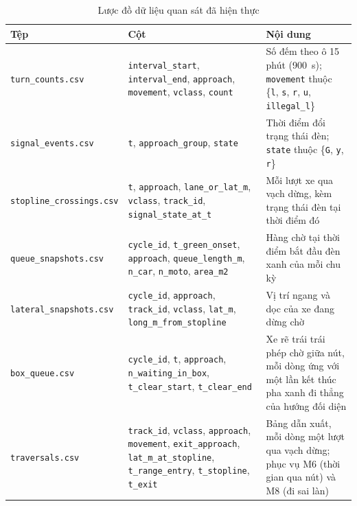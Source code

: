 \documentclass[../main.tex]{subfiles}
\begin{document}
\begin{table}[!htbp]
\centering
\small\setlength{\tabcolsep}{3pt}
\caption{Lược đồ dữ liệu quan sát đã hiện thực}
\label{table:appendix_schema}
\begin{tabular}{|p{3.7cm}|p{5.1cm}|p{4.2cm}|}
\hline
\textbf{Tệp} & \textbf{Cột} & \textbf{Nội dung} \\ \hline
\texttt{turn\_\allowbreak counts.csv} & \texttt{interval\_\allowbreak start}, \texttt{interval\_\allowbreak end}, \texttt{approach}, \texttt{movement}, \texttt{vclass}, \texttt{count} & Số đếm theo ô 15 phút (900~s); \texttt{movement} thuộc \{\texttt{l}, \texttt{s}, \texttt{r}, \texttt{u}, \texttt{illegal\_\allowbreak l}\} \\ \hline
\texttt{signal\_\allowbreak events.csv} & \texttt{t}, \texttt{approach\_\allowbreak group}, \texttt{state} & Thời điểm đổi trạng thái đèn; \texttt{state} thuộc \{\texttt{G}, \texttt{y}, \texttt{r}\} \\ \hline
\texttt{stopline\_\allowbreak crossings.csv} & \texttt{t}, \texttt{approach}, \texttt{lane\_\allowbreak or\_\allowbreak lat\_\allowbreak m}, \texttt{vclass}, \texttt{track\_\allowbreak id}, \texttt{signal\_\allowbreak state\_\allowbreak at\_\allowbreak t} & Mỗi lượt xe qua vạch dừng, kèm trạng thái đèn tại thời điểm đó \\ \hline
\texttt{queue\_\allowbreak snapshots.csv} & \texttt{cycle\_\allowbreak id}, \texttt{t\_\allowbreak green\_\allowbreak onset}, \texttt{approach}, \texttt{queue\_\allowbreak length\_\allowbreak m}, \texttt{n\_\allowbreak car}, \texttt{n\_\allowbreak moto}, \texttt{area\_\allowbreak m2} & Hàng chờ tại thời điểm bắt đầu đèn xanh của mỗi chu kỳ \\ \hline
\texttt{lateral\_\allowbreak snapshots.csv} & \texttt{cycle\_\allowbreak id}, \texttt{approach}, \texttt{track\_\allowbreak id}, \texttt{vclass}, \texttt{lat\_\allowbreak m}, \texttt{long\_\allowbreak m\_\allowbreak from\_\allowbreak stopline} & Vị trí ngang và dọc của xe đang dừng chờ \\ \hline
\texttt{box\_\allowbreak queue.csv} & \texttt{cycle\_\allowbreak id}, \texttt{t}, \texttt{approach}, \texttt{n\_\allowbreak waiting\_\allowbreak in\_\allowbreak box}, \texttt{t\_\allowbreak clear\_\allowbreak start}, \texttt{t\_\allowbreak clear\_\allowbreak end} & Xe rẽ trái trái phép chờ giữa nút, mỗi dòng ứng với một lần kết thúc pha xanh đi thẳng của hướng đối diện \\ \hline
\texttt{traversals.csv} & \texttt{track\_\allowbreak id}, \texttt{vclass}, \texttt{approach}, \texttt{movement}, \texttt{exit\_\allowbreak approach}, \texttt{lat\_\allowbreak m\_\allowbreak at\_\allowbreak stopline}, \texttt{t\_\allowbreak range\_\allowbreak entry}, \texttt{t\_\allowbreak stopline}, \texttt{t\_\allowbreak exit} & Bảng dẫn xuất, mỗi dòng một lượt qua vạch dừng; phục vụ M6 (thời gian qua nút) và M8 (đi sai làn) \\ \hline

\end{tabular}
\end{table}
\end{document}

